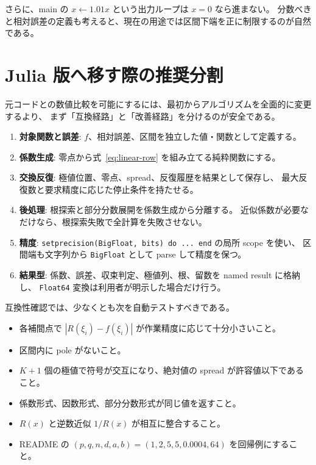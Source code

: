 \documentclass[a4paper,11pt]{ltjsarticle}
\newcommand{\code}[1]{\texttt{#1}}
\begin{document}
さらに、main の \(x\leftarrow1.01x\) という出力ループは \(x=0\) なら進まない。
分数べきと相対誤差の定義も考えると、現在の用途では区間下端を正に制限するのが自然である。

\section{Julia 版へ移す際の推奨分割}

元コードとの数値比較を可能にするには、最初からアルゴリズムを全面的に変更するより、
まず「互換経路」と「改善経路」を分けるのが安全である。

\begin{enumerate}
  \item \textbf{対象関数と誤差}: \(f\)、相対誤差、区間を独立した値・関数として定義する。
  \item \textbf{係数生成}: 零点から式~\eqref{eq:linear-row} を組み立てる純粋関数にする。
  \item \textbf{交換反復}: 極値位置、零点、spread、反復履歴を結果として保存し、
        最大反復数と要求精度に応じた停止条件を持たせる。
  \item \textbf{後処理}: 根探索と部分分数展開を係数生成から分離する。
        近似係数が必要なだけなら、根探索失敗で全計算を失敗させない。
  \item \textbf{精度}: \code{setprecision(BigFloat, bits) do ... end} の局所 scope を使い、
        区間端も文字列から \code{BigFloat} として parse して精度を保つ。
  \item \textbf{結果型}: 係数、誤差、収束判定、極値列、根、留数を named result に格納し、
        \code{Float64} 変換は利用者が明示した場合だけ行う。
\end{enumerate}

互換性確認では、少なくとも次を自動テストすべきである。

\begin{itemize}
  \item 各補間点で \(|R(\xi_i)-f(\xi_i)|\) が作業精度に応じて十分小さいこと。
  \item 区間内に pole がないこと。
  \item \(K+1\) 個の極値で符号が交互になり、絶対値の spread が許容値以下であること。
  \item 係数形式、因数形式、部分分数形式が同じ値を返すこと。
  \item \(R(x)\) と逆数近似 \(1/R(x)\) が相互に整合すること。
  \item README の \((p,q,n,d,a,b)=(1,2,5,5,0.0004,64)\) を回帰例にすること。
\end{itemize}
\end{document}
